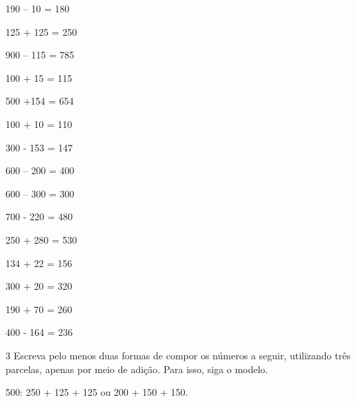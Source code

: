 \begin{minipage}{.5\textwidth}
\begin{escolha}
\item 190 -- 10 = 180

\item 125 + 125 = 250

\item 900 -- 115 = 785

\item 100 + 15 = 115

\item 500 +154 = 654

\item 100 + 10 = 110

\item 300 - 153 = 147

\item 600 -- 200 = 400

\item 600 -- 300 = 300

\item 700 - 220 = 480

\item 250 + 280 = 530

\item 134 + 22 = 156

\item 300 + 20 = 320

\item 190 + 70 = 260

\item 400 - 164 = 236
\end{escolha}
\end{minipage}

\num{3} Escreva pelo menos duas formas de compor os números a seguir, utilizando
três parcelas, apenas por meio de adição. Para isso, siga o modelo.


\begin{mdframed}[linewidth=2pt,linecolor=azul!20,backgroundcolor=azul!20,roundcorner=2pt]
500: 250 + 125 + 125 ou 200 + 150 + 150.
\end{mdframed}

